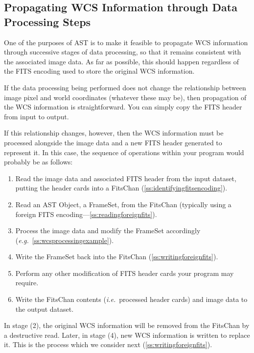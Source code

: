 \documentclass[twoside,11pt]{article}
\newcommand{\secref}[1]{\S\ref{#1}}
\renewcommand{\secref}[1]{\ref{#1}}
\begin{document}
\subsection{\label{ss:propagatingwcsinformation}Propagating WCS Information through Data Processing Steps}

One of the purposes of AST is to make it feasible to propagate WCS
information through successive stages of data processing, so that it
remains consistent with the associated image data. As far as possible,
this should happen regardless of the FITS encoding used to store the
original WCS information.

If the data processing being performed does not change the
relationship between image pixel and world coordinates (whatever these
may be), then propagation of the WCS information is
straightforward. You can simply copy the FITS header from input to
output.

If this relationship changes, however, then the WCS information must
be processed alongside the image data and a new FITS header generated
to represent it. In this case, the sequence of operations within your
program would probably be as follows:

\begin{enumerate}
\item Read the image data and associated FITS header from the input
dataset, putting the header cards into a FitsChan
(\secref{ss:identifyingfitsencoding}).

\item Read an AST Object, a FrameSet, from the FitsChan (typically
using a foreign FITS encoding---\secref{ss:readingforeignfits}).

\item Process the image data and modify the FrameSet accordingly
({\em{e.g.}}~\secref{ss:wcsprocessingexample}).

\item Write the FrameSet back into the FitsChan
(\secref{ss:writingforeignfits}).

\item Perform any other modification of FITS header cards your program
may require.

\item Write the FitsChan contents ({\em{i.e.}}\ processed header
cards) and image data to the output dataset.
\end{enumerate}

In stage (2), the original WCS information will be removed from the
FitsChan by a destructive read. Later, in stage (4), new WCS
information is written to replace it. This is the process which we
consider next (\secref{ss:writingforeignfits}).
\end{document}
